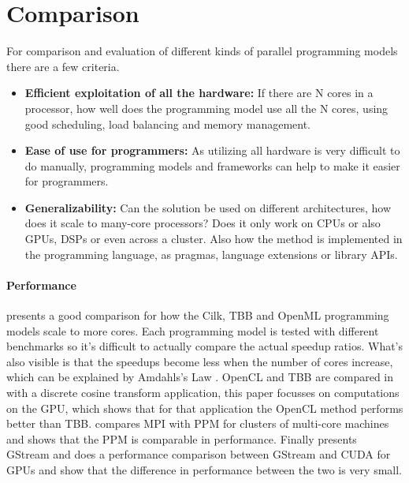 \section{Comparison}



For comparison and evaluation of different kinds of parallel programming
models there are a few criteria.

\begin{itemize}
	\item \textbf{Efficient exploitation of all the hardware:} If there are N
		cores in a processor, how well does the programming model use all the N
		cores, using good scheduling, load balancing and memory management.
	\item \textbf{Ease of use for programmers:} As utilizing all hardware is
		very difficult to do manually, programming models and frameworks can
		help to make it easier for programmers.
	\item \textbf{Generalizability:} Can the solution be used on different
		architectures, how does it scale to many-core processors? Does it only
		work on CPUs or also GPUs, DSPs or even across a cluster. Also how the
		method is implemented in the programming language, as pragmas, language
		extensions or library APIs.
\end{itemize}

\paragraph{Performance} \cite{CaoPerformanceAnalysis} presents a good
comparison for how the Cilk, TBB and OpenML programming models scale to more
cores. Each programming model is tested with different benchmarks so it's
difficult to actually compare the actual speedup ratios. What's also visible is
that the speedups become less when the number of cores increase, which can be
explained by Amdahls's Law \cite{hennessy2007computer}. OpenCL and TBB are
compared in \cite{KimExploitingMultiManyCore} with a discrete cosine transform
application, this paper focusses on computations on the GPU, which shows that
for that application the OpenCL method performs better than TBB.
\cite{BrightwellParallelPhaseModel} compares MPI with PPM for clusters of
multi-core machines and shows that the PPM is comparable in performance.
Finally \cite{ZhangDataParallelProgramming} presents GStream and does a
performance comparison between GStream and CUDA for GPUs and show that the
difference in performance between the two is very small.

